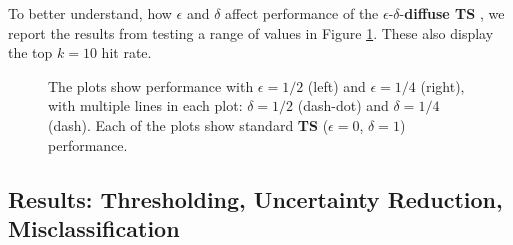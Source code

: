 \documentclass[nonblindrev]{informs3}
\newcommand{\ts}{\textbf{TS} }
\newcommand{\edts}{$\epsilon$-$\delta$-\textbf{diffuse TS} }
\begin{document}
To better understand, how $\epsilon$ and $\delta$ affect performance of the \edts, we report the results from testing a range of values in Figure \ref{fig:effects_epsilon_delta}. These also display the top $k=10$ hit rate.


\begin{figure}
\caption{The plots show performance with $\epsilon = 1/2$ (left) and $\epsilon = 1/4$ (right), with multiple lines in each plot: $\delta = 1/2$ (dash-dot) and $\delta = 1/4$ (dash). Each of the plots show standard \ts ($\epsilon = 0$, $\delta =1$) performance.}
\label{fig:effects_epsilon_delta}
 	\begin{center}
    \qquad
    \end{center}
\end{figure}



\subsection{Results: Thresholding, Uncertainty Reduction, Misclassification}
\end{document}
